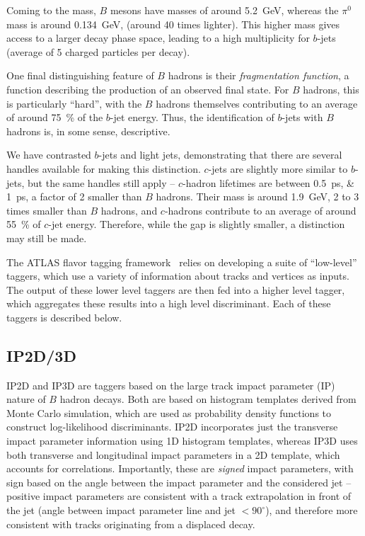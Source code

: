 Coming to the mass, $B$ mesons have masses of around \SI{5.2}{\GeV}, whereas the $\pi^{0}$ mass is around \SI{0.134}{\GeV},
(around 40 times lighter). This higher mass gives access to a larger decay phase space, leading to a high multiplicity 
for $b$-jets (average of 5 charged particles per decay).

One final distinguishing feature of $B$ hadrons is their \emph{fragmentation function}, a function describing the 
production of an observed final state. For $B$ hadrons, this is particularly ``hard'', with the $B$ hadrons themselves 
contributing to an average of around 75~\% of the $b$-jet energy. Thus, the identification of $b$-jets with $B$ hadrons 
is, in some sense, descriptive.

We have contrasted $b$-jets and light jets, demonstrating that there are several handles available for making this 
distinction. $c$-jets are slightly more similar to $b$-jets, but the same handles still apply -- $c$-hadron lifetimes are
between \SIlist{0.5;1}{\ps}, a factor of 2 smaller than $B$ hadrons. Their mass is around \SI{1.9}{\GeV}, 2 to 3 times 
smaller than $B$ hadrons, and $c$-hadrons contribute to an average of around 55~\% of $c$-jet energy. Therefore, while 
the gap is slightly smaller, a distinction may still be made.

The ATLAS flavor tagging framework~\cite{FTAG-2018-01} relies on developing a suite of ``low-level'' taggers, which 
use a variety of information about tracks and vertices as inputs. The output of these lower level taggers are then 
fed into a higher level tagger, which aggregates these results into a high level discriminant. Each of these taggers 
is described below.

\FloatBarrier
\subsection{IP2D/3D}
IP2D and IP3D are taggers based on the large track impact parameter (IP) nature of $B$ hadron decays. Both are 
based on histogram templates derived from Monte Carlo simulation, which are used as probability density 
functions to construct log-likelihood discriminants. IP2D incorporates just the transverse impact parameter 
information using 1D histogram templates, whereas IP3D uses both transverse and longitudinal impact parameters 
in a 2D template, which accounts for correlations. Importantly, these are \emph{signed} impact 
parameters, with sign based on the angle between the impact parameter and the considered jet -- positive impact 
parameters are consistent with a track extrapolation in front of the jet (angle between impact parameter 
line and jet $<90^{\circ}$), and therefore more consistent with tracks originating from a displaced decay.

